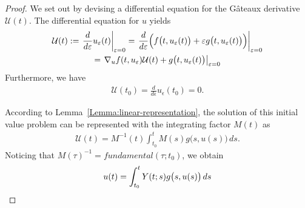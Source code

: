 

\begin{proof}
  We set out by devising a differential equation for the Gâteaux
  derivative $\mathcal U(t)$. The differential equation for $u$ yields
  \begin{multline*}
    \mathcal U(t) := \left.\frac{d}{d\epsilon} u_\epsilon(t)\right|_{\epsilon=0}
    = \left.\frac{d}{d\epsilon}
    \Bigl(f\bigl(t,u_\epsilon(t)\bigr)
    + \epsilon g\bigl(t,u_\epsilon(t)\bigr)\Bigr) \right|_{\epsilon=0}
  \\
    = \left.\nabla_u f(t,u_\epsilon) \mathcal U(t)
    + g\bigl(t,u_\epsilon(t)\bigr) \right|_{\epsilon=0}
  \end{multline*}
  Furthermore, we have
  \begin{gather*}
     \mathcal U(t_0) = \frac{d}{d\epsilon} u_\epsilon(t_0) = 0.
  \end{gather*}

  According to Lemma~\ref{Lemma:linear-representation}, the solution
  of this initial value problem can be represented with the
  integrating factor $M(t)$ as
  \begin{gather*}
    \mathcal U(t) = M^{-1}(t) \int_{t_0}^t M(s) g\bigl(s,u(s)\bigr)
    \,d s.
  \end{gather*}
  Noticing that $M(\tau)^{-1} = fundamental(\tau;t_0)$, we obtain
  \begin{gather*}
    u(t) = \int_{t_0}^t \fundamental(t;s) g\bigl(s,u(s)\bigr) \,d s
  \end{gather*}
\end{proof}


